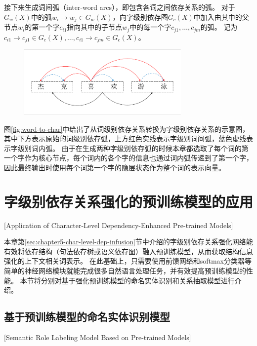 接下来生成词间弧（inter-word arcs），即包含各词之间依存关系的弧。
对于$G_w(X)$中的弧$w_i \rightarrow w_j \in G_w(X)$，向字级别依存图$G_c(X)$中加入由其中的父节点$w_i$的第一个字$c_{i1}$指向其中的子节点$w_j$中的每一个字$c_{j1}, \dots, c_{jm}$的弧。
记为$c_{i1} \rightarrow c_{j1} \in G_c(X), \dots, c_{i1} \rightarrow c_{jm} \in G_c(X)$。

\begin{figure}[hbtp]
	\centering
	\includegraphics[width=0.75\textwidth]{figures/word-to-char.pdf}
\end{figure}

图\ref{fig:word-to-char}中给出了从词级别依存关系转换为字级别依存关系的示意图，其中下方表示原始的词级别依存弧，上方红色实线表示字级别词间弧，蓝色虚线表示字级别词内弧。
由于在生成两种字级别依存弧的时候本章都选取了每个词的第一个字作为核心节点，每个词内的各个字的信息也通过词内弧传递到了第一个字，因此最终输出时使用每个词第一个字的隐层状态作为整个词的表示向量。


\section{字级别依存关系强化的预训练模型的应用}[Application of Character-Level Dependency-Enhanced Pre-trained Models]

本章第\ref{sec:chapter5-char-level-dep-infusion}节中介绍的字级别依存关系强化网络能有效将依存结构（句法依存树或语义依存图）融入预训练模型，从而获取结构信息强化的上下文相关词表示。
在此基础上，只需要使用前馈网络和softmax分类器等简单的神经网络模块就能完成很多自然语言处理任务，并有效提高预训练模型的性能。
本节将分别对基于强化预训练模型的命名实体识别和关系抽取模型进行介绍。

\subsection{基于预训练模型的命名实体识别模型}[Semantic Role Labeling Model Based on Pre-trained Models]

